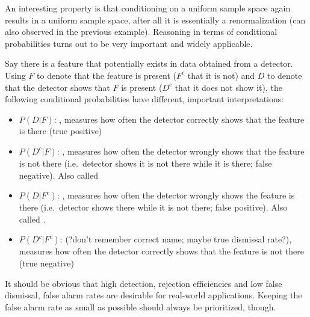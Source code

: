 An interesting property is that conditioning on a uniform sample space again results in a uniform sample space, after all it is essentially a renormalization (can also observed in the previous example). Reasoning in terms of conditional probabilities turns out to be very important and widely applicable.


Say there is a feature that potentially exists in data obtained from a detector. Using $F$ to denote that the feature is present ($F^c$ that it is not) and $D$ to denote that the detector shows that $F$ is present ($D^c$ that it does not show it)\footnotemark, the following conditional probabilities have different, important interpretations:
\begin{defi}
\begin{itemize}
\item $P(D | F)$: , measures how often the detector correctly shows that the feature is there (true positive)

\item $P(D^c | F)$: , measures how often the detector wrongly shows that the feature is not there (i.e.~detector shows it is not there while it is there; false negative). Also called 

\item $P(D | F^c)$: , measures how often the detector wrongly shows the feature is there (i.e.~detector shows there while it is not there; false positive). Also called .

\item $P(D^c | F^c)$:  (?don't remember correct name; maybe true dismissal rate?), measures how often the detector correctly shows that the feature is not there (true negative)
\end{itemize}
\end{defi}
It should be obvious that high detection, rejection efficiencies and low false dismissal, false alarm rates are desirable for real-world applications. Keeping the false alarm rate as small as possible should always be prioritized, though.



